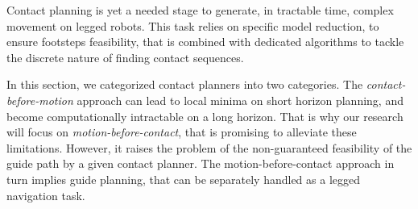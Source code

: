 

Contact planning is yet a needed stage to generate, in tractable time, complex movement on legged robots.
This task relies on specific model reduction, to ensure footsteps feasibility, that is combined with dedicated algorithms to tackle the discrete nature of finding contact sequences.

In this section, we categorized contact planners into two categories.
The \textit{contact-before-motion} approach can lead to local minima on short horizon planning, and become computationally intractable on a long horizon.
That is why our research will focus on \textit{motion-before-contact}, that is promising to alleviate these limitations.
However, it raises the problem of the non-guaranteed feasibility of the guide path by a given contact planner.
The motion-before-contact approach in turn implies guide planning, that can be separately handled as a legged navigation task.





